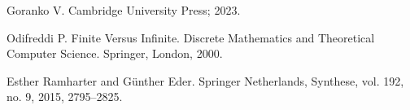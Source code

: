 \documentclass[openany]{book}
\theoremstyle{plain}
\theoremstyle{definition}
\begin{document}
\begin{thebibliography}{2}
    Goranko V.
    \newblock Cambridge University Press; 2023.

    Odifreddi P.
    \newblock Finite Versus Infinite. Discrete Mathematics and Theoretical Computer Science. Springer, London, 2000.

    Esther Ramharter and G\"{u}nther Eder.
    \newblock Springer Netherlands, Synthese, vol. 192, no. 9, 2015, 2795--2825.


\end{thebibliography}
\end{document}
